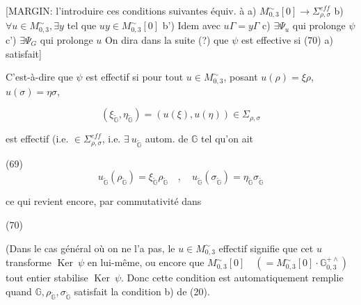\begin{enumerate}
\newpage



\newpage



\newpage



\newpage



\newpage


[MARGIN: l'introduire
ces conditions
suivantes équiv. à
a) $M_{0,3}^\sim [0] \to \Sigma_{\rho,\sigma}^{eff}$
b) $\forall u \in M_{0,3}^\sim, \exists y$
tel que $uy \in M_{0,3}^\sim [0]$
b') Idem avec $u\Gamma = y\Gamma$
c) $\exists \Psi_u$ qui prolonge $\psi$
c') $\exists \Psi_G$ qui prolonge $u$
On dira dans
la suite (?)
que $\psi$ est effective
si (70) a) satisfait]

C'est-à-dire que $\psi$ est effectif si pour
tout $u \in M_{0,3}^\sim$, posant $u(\rho) = \xi \rho$, $u(\sigma) = \eta \sigma$,

$$(\xi_{\tilde{\mathbb{G}}}, \eta_{\tilde{\mathbb{G}}}) = (u(\xi), u(\eta)) \in \Sigma_{\rho,\sigma}$$

est effectif (i.e. $\in \Sigma_{\rho,\sigma}^{eff}$, i.e. $\exists\ u_{\tilde{\mathbb{G}}}$ autom.
de $\mathbb{G}$ tel qu'on ait

(69) $$u_{\tilde{\mathbb{G}}}(\rho_{\tilde{\mathbb{G}}}) = \xi_{\tilde{\mathbb{G}}} \rho_{\tilde{\mathbb{G}}} \quad , \quad u_{\tilde{\mathbb{G}}}(\sigma_{\tilde{\mathbb{G}}}) = \eta_{\tilde{\mathbb{G}}} \sigma_{\tilde{\mathbb{G}}}$$

ce qui revient encore, par commutativité dans

(70)

(Dans le cas général où on ne l'a pas, le $u \in M_{0,3}^\sim$ effectif signifie que cet $u$ transforme
$\operatorname{Ker}\ \psi$ en lui-même, ou encore que
$M_{0,3}^\sim [0] \quad (= M_{0,3}^\sim [0] \cdot \mathbb{G}_{0,3}^{+\wedge})$ tout entier
stabilise $\operatorname{Ker}\ \psi$. Donc cette condition
est automatiquement remplie
quand $\mathbb{G}, \rho_{\tilde{\mathbb{G}}}, \sigma_{\tilde{\mathbb{G}}}$ satisfait la condition
b) de (20).


\end{enumerate}
